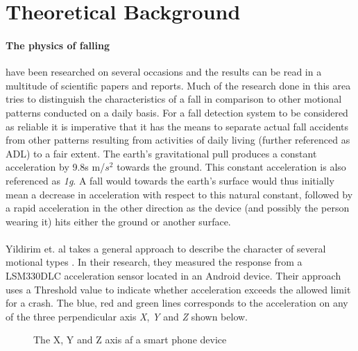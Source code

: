\documentclass[12pt, a4paper, onecolumn]{article}
\begin{document}
\section{Theoretical Background}
	
	\paragraph{The physics of falling} have been researched on several occasions and the results can be read in a multitude of scientific papers and reports. Much of the research done in this area tries to distinguish the characteristics of a fall in comparison to other motional patterns conducted on a daily basis. For a fall detection system to be considered as reliable it is imperative that it has the means to separate actual fall accidents from other patterns resulting from activities of daily living (further referenced as ADL) to a fair extent. The earth's gravitational pull produces a constant acceleration by 9.8s m/$s^{2}$ towards the ground. This constant acceleration is also referenced as \textit{1g}. A fall would towards the earth's surface would thus initially mean a decrease in acceleration with respect to this natural constant, followed by a rapid acceleration in the other direction as the device (and possibly the person wearing it) hits either the ground or another surface.
	

	\paragraph{} Yildirim et. al takes a general approach to describe the character of several motional types \cite{int_journ}. In their research, they measured the response from a LSM330DLC acceleration sensor located in an Android device. Their approach uses a Threshold value to indicate whether acceleration exceeds the allowed limit for a crash. The blue, red and green lines corresponds to the acceleration on any of the three perpendicular axis \textit{X}, \textit{Y} and \textit{Z} shown below.
	
		\begin{figure}[h]
			\centering
			\caption{The X, Y and Z axis af a smart phone device}%
			\label{fig:example}%
		\end{figure}
	
\end{document}
